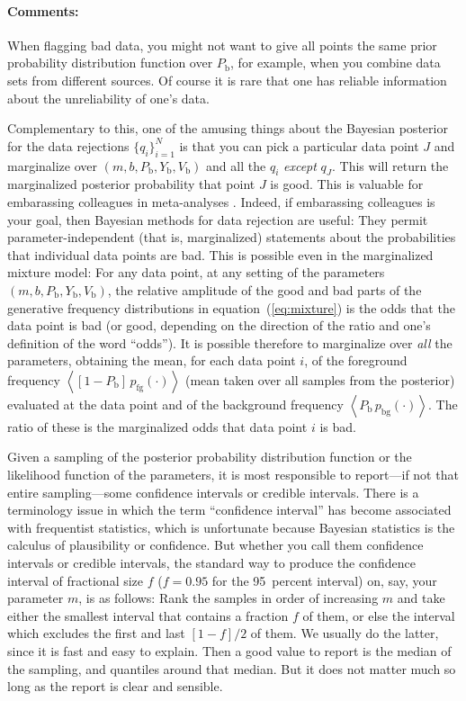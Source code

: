 \documentclass[12pt,twoside]{article}
\newcommand{\commentsname}{Comments}
\newenvironment{comments}{\paragraph{\commentsname:}}{}
\newcommand{\setofall}[3]{\{{#1}\}_{{#2}}^{{#3}}}
\newcommand{\allq}{\setofall{q_i}{i=1}{N}}
\newcommand{\pfg}{p_{\mathrm{fg}}}
\newcommand{\pbg}{p_{\mathrm{bg}}}
\newcommand{\Pbad}{P_{\mathrm{b}}}
\newcommand{\Ybad}{Y_{\mathrm{b}}}
\newcommand{\Vbad}{V_{\mathrm{b}}}
\begin{document}
\begin{comments}
When flagging bad data, you might not want to give all points the same
prior probability distribution function over $\Pbad$, for example,
when you combine data sets from different sources.  Of course it is
rare that one has reliable information about the unreliability of
one's data.

Complementary to this, one of the amusing things about the Bayesian
posterior for the data rejections $\allq$ is that you
can pick a particular data point $J$ and marginalize over
$(m,b,\Pbad,\Ybad,\Vbad)$ and all the $q_i$ \emph{except} $q_J$.  This
will return the marginalized posterior probability that point $J$ is
good.  This is valuable for embarassing colleagues in meta-analyses
\citep{pressH0}.  Indeed, if embarassing colleagues is your goal, then
Bayesian methods for data rejection are useful: They permit
parameter-independent (that is, marginalized) statements about the
probabilities that individual data points are bad.  This is possible
even in the marginalized mixture model: For any data point, at any
setting of the parameters $(m,b,\Pbad,\Ybad,\Vbad)$, the relative
amplitude of the good and bad parts of the generative frequency
distributions in equation~(\ref{eq:mixture}) is the odds that the data
point is bad (or good, depending on the direction of the ratio and
one's definition of the word ``odds'').  It is possible therefore to
marginalize over \emph{all} the parameters, obtaining the mean, for
each data point $i$, of the foreground frequency
$\left<[1-\Pbad]\,\pfg(\cdot)\right>$ (mean taken over all samples
from the posterior) evaluated at the data point and of the background
frequency $\left<\Pbad\,\pbg(\cdot)\right>$.  The ratio of these is
the marginalized odds that data point $i$ is bad.

Given a sampling of the posterior probability distribution function or
the likelihood function of the parameters, it is most responsible to
report---if not that entire sampling---some confidence intervals or
credible intervals.  There is a terminology issue in which the term
``confidence interval'' has become associated with frequentist
statistics, which is unfortunate because Bayesian statistics is the
calculus of plausibility or confidence.  But whether you call them
confidence intervals or credible intervals, the standard way to
produce the confidence interval of fractional size $f$ ($f=0.95$ for
the 95~percent interval) on, say, your parameter $m$, is as follows:
Rank the samples in order of increasing $m$ and take either the
smallest interval that contains a fraction $f$ of them, or else the
interval which excludes the first and last $[1-f]/2$ of them.  We
usually do the latter, since it is fast and easy to explain.  Then a
good value to report is the median of the sampling, and quantiles
around that median.  But it does not matter much so long as the report
is clear and sensible.


\end{comments}
\end{document}
